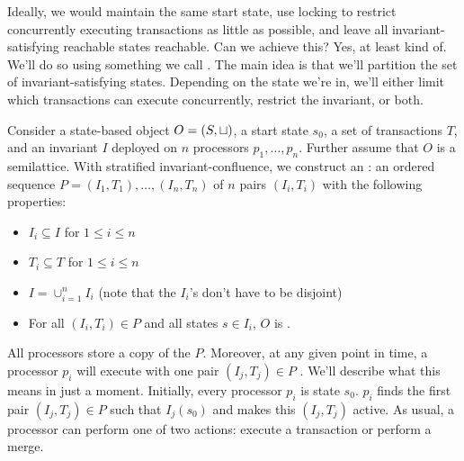 Ideally, we would maintain the same start state, use locking to restrict
concurrently executing transactions as little as possible, and leave all
invariant-satisfying reachable states reachable. Can we achieve this?  Yes, at
least kind of. We'll do so using something we call . The main idea is that we'll partition the set of
invariant-satisfying states. Depending on the state we're in, we'll either
limit which transactions can execute concurrently, restrict the invariant, or
both.

Consider a state-based object $O = (S, \sqcup)$, a start state $s_0$, a set of
transactions $T$, and an invariant $I$ deployed on $n$ processors $p_1, \ldots,
p_n$. Further assume that $O$ is a semilattice.
%
With stratified invariant-confluence, we construct an \ITpartition{}: an
ordered sequence $P = (I_1, T_1), \ldots, (I_n, T_n)$ of $n$ pairs $(I_i, T_i)$
with the following properties:
\begin{itemize}
  \item
    $I_i \subseteq I$ for $1 \leq i \leq n$

  \item
    $T_i \subseteq T$ for $1 \leq i \leq n$

  \item
    $I = \cup_{i=1}^n I_i$ (note that the $I_i$'s don't have to be disjoint)

  \item
    For all $(I_i, T_i) \in P$ and all states $s \in I_i$, $O$ is
    .
\end{itemize}
All processors store a copy of the \ITpartition{} $P$. Moreover, at any given
point in time, a processor $p_i$ will execute with one pair $(I_j, T_j) \in P$
. We'll describe what this means in just a moment. Initially,
every processor $p_i$ is state $s_0$. $p_i$ finds the first pair $(I_j, T_j)
\in P$ such that $I_j(s_0)$ and makes this $(I_j, T_j)$ active. As usual, a
processor can perform one of two actions: execute a transaction or perform a
merge.
